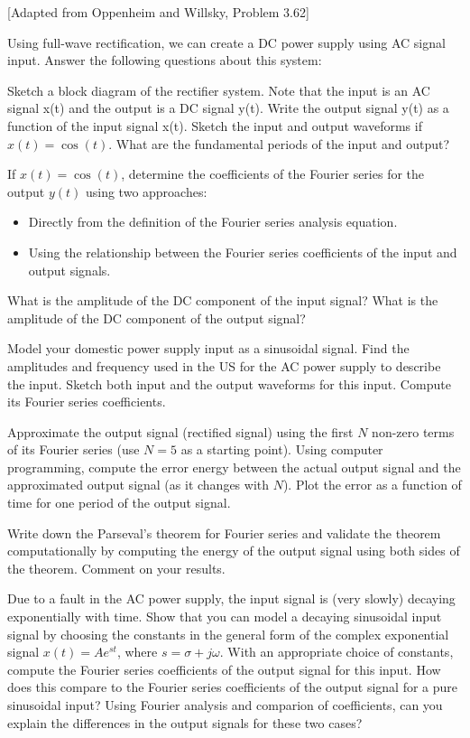 \documentclass{ee102_pset}
\author{\rule{3cm}{0.4pt}} %
\begin{document}

[Adapted from Oppenheim and Willsky, Problem 3.62]

Using full-wave rectification, we can create a DC power supply using AC signal input. Answer the following questions about this system:

\problempart[5 points] Sketch a block diagram of the rectifier system. Note that the input is an AC signal x(t) and the output is a DC signal y(t).
\problempart[5 points] Write the output signal y(t) as a function of the input signal x(t).
\problempart[5 points] Sketch the input and output waveforms if $x(t) = \cos(t)$. What are the fundamental periods of the input and output?

\problempart[15 points] If $x(t) = \cos(t)$, determine the coefficients of the Fourier series for the output $y(t)$ using two approaches: 
\begin{itemize}
\item Directly from the definition of the Fourier series analysis equation.
\item Using the relationship between the Fourier series coefficients of the input and output signals.
\end{itemize}

\problempart[10 points] What is the amplitude of the DC component of the input signal? What is the amplitude of the DC component of the output signal?

\problempart[10 points] Model your domestic power supply input as a sinusoidal signal. Find the amplitudes and frequency used in the US for the AC power supply to describe the input. Sketch both input and the output waveforms for this input. Compute its Fourier series coefficients.

\problempart[20 points] Approximate the output signal (rectified signal) using the first $N$ non-zero terms of its Fourier series (use $N = 5$ as a starting point). Using computer programming, compute the error energy between the actual output signal and the approximated output signal (as it changes with $N$). Plot the error as a function of time for one period of the output signal.

\problempart[10 points] Write down the Parseval's theorem for Fourier series and validate the theorem computationally by computing the energy of the output signal using both sides of the theorem. Comment on your results.

\problempart[20 points] Due to a fault in the AC power supply, the input signal is (very slowly) decaying exponentially with time. Show that you can model a decaying sinusoidal input signal by choosing the constants in the general form of the complex exponential signal $x(t) = Ae^{st}$, where $s = \sigma + j\omega$. With an appropriate choice of constants, compute the Fourier series coefficients of the output signal for this input. How does this compare to the Fourier series coefficients of the output signal for a pure sinusoidal input? Using Fourier analysis and comparion of coefficients, can you explain the differences in the output signals for these two cases?
\end{document}

